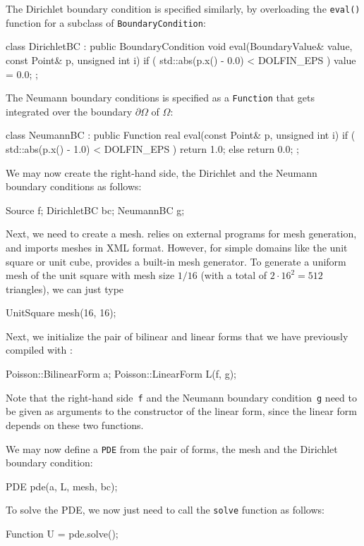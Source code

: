 The Dirichlet boundary condition is specified similarly, by overloading the
\texttt{eval()} function for a subclass of \texttt{BoundaryCondition}:
\small
\begin{code}
class DirichletBC : public BoundaryCondition
{
  void eval(BoundaryValue& value, const Point& p, unsigned int i)
  {
    if ( std::abs(p.x() - 0.0) < DOLFIN_EPS )
      value = 0.0;
  }
};
\end{code}
\normalsize
The Neumann boundary conditions is specified as a \texttt{Function}
that gets integrated over the boundary $\partial \Omega$ of $\Omega$:
\begin{code}
class NeumannBC : public Function
{
  real eval(const Point& p, unsigned int i)
  {
    if ( std::abs(p.x() - 1.0) < DOLFIN_EPS )
      return 1.0;
    else
      return 0.0;
  }
};
\end{code}
We may now create the right-hand side, the Dirichlet and the Neumann
boundary conditions as follows:
\begin{code}
Source f;
DirichletBC bc;
NeumannBC g;
\end{code}

Next, we need to create a mesh. \dolfin{} relies on
external programs for mesh generation, and imports meshes in \dolfin{}
XML format. However, for simple domains like the unit square or unit
cube, \dolfin{} provides a built-in mesh generator. To generate a
uniform mesh of the unit square with mesh size $1/16$ (with a total of
$2\cdot 16^2 = 512$ triangles), we can just type
\begin{code}
UnitSquare mesh(16, 16);
\end{code}

Next, we initialize the pair of bilinear and linear forms that we have
previously compiled with \ffc{}:
\begin{code}
Poisson::BilinearForm a;
Poisson::LinearForm L(f, g);
\end{code}
Note that the right-hand side~\texttt{f} and the Neumann boundary
condition~\texttt{g} need to be given as arguments to the constructor
of the linear form, since the linear form depends on these two functions.

We may now define a \texttt{PDE} from the pair of forms, the mesh and
the Dirichlet boundary condition:
\begin{code}
PDE pde(a, L, mesh, bc);
\end{code}
To solve the PDE, we now just need to call the \texttt{solve} function
as follows:
\begin{code}
Function U = pde.solve();
\end{code}

